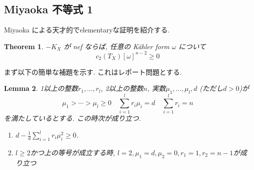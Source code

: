 \documentclass[dvipdfmx,a4paper,11pt]{article} %
\newtheorem{thm}{Theorem}[section]
\newtheorem{lem}[thm]{Lemma}
\theoremstyle{definition}
\theoremstyle{remark}
\numberwithin{equation}{section}
\begin{document}
\subsection{Miyaoka 不等式 1}
Miyaoka \cite{Miy87}による天才的でelementaryな証明を紹介する. 
\begin{thm}
\label{thm-semipositivity-1}
\(-K_X\) が nef ならば, 任意の Kähler form \(\omega\)
について
\[
c_2(T_X) [\omega]^{n-2}\geq 0
\]

\end{thm}

まず以下の簡単な補題を示す. これはレポート問題とする.
\begin{lem}
\label{lem-miyaoka-1}
1以上の整数$r_1, \ldots, r_l$, 2以上の整数$n$, 実数$\mu_1, \ldots, \mu_l, d$ (ただし$d>0$)が
\[
\mu_1 > \cdots > \mu_l \geq 0
\quad
\sum_{i=1}^{l}r_i\mu_i=d
\quad 
\sum_{i=1}^{l}r_i=n
\]
を満たしているとする. 
この時次が成り立つ.
\begin{enumerate}
\item  $d-\frac{1}{d} \sum_{i=1}^{l}r_i \mu_i^2 \ge 0$.
\item $l \ge 2$かつ上の等号が成立する時, $l=2,\mu_1=d, \mu_2=0,r_1=1,r_2=n-1$が成り立つ
\end{enumerate}
\end{lem}
\end{document}
